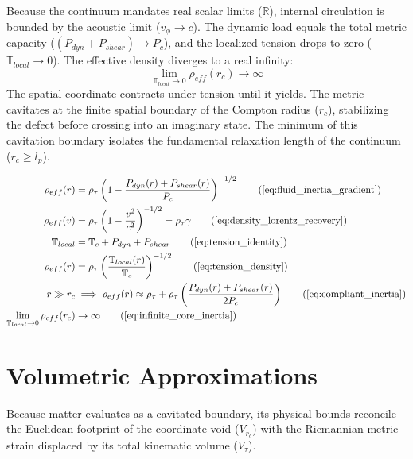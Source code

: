 Because the continuum mandates real scalar limits ($\mathbb{R}$), internal circulation is bounded by the acoustic limit ($v_\phi \to c$). The dynamic load equals the total metric capacity ($(P_{dyn} + P_{shear}) \to P_c$), and the localized tension drops to zero ($\mathbb{T}_{local} \to 0$). The effective density diverges to a real infinity: 
\begin{equation}
    \lim_{\mathbb{T}_{local} \to 0} \rho_{eff}(r_c) \to \infty \label{eq:infinite_core_inertia}
\end{equation}
The spatial coordinate contracts under tension until it yields. The metric cavitates at the finite spatial boundary of the Compton radius ($r_c$), stabilizing the defect before crossing into an imaginary state. The minimum of this cavitation boundary isolates the fundamental relaxation length of the continuum ($r_c \ge l_p$).

\begin{tcolorbox}[recallbox, title={\ref{box:fluid_inertia}. Origin of Inertia (Strain Compactness \& Tension)}]
\begin{align}
    \rho_{eff}(r) &= \rho_{\tau} \left( 1 - \frac{P_{dyn}(r) + P_{shear}(r)}{P_c} \right)^{-1/2} \tag{\ref{eq:fluid_inertia_gradient}} \\
    \rho_{eff}(v) &= \rho_{\tau} \left( 1 - \frac{v^2}{c^2} \right)^{-1/2} = \rho_{\tau} \gamma \tag{\ref{eq:density_lorentz_recovery}} \\
    \mathbb{T}_{local} &= \mathbb{T}_c + P_{dyn} + P_{shear} \tag{\ref{eq:tension_identity}} \\
    \rho_{eff}(r) &= \rho_{\tau} \left( \frac{\mathbb{T}_{local}(r)}{\mathbb{T}_c} \right)^{-1/2} \tag{\ref{eq:tension_density}} \\
    r \gg r_c &\implies \rho_{eff}(r) \approx \rho_{\tau} + \rho_{\tau} \left( \frac{P_{dyn}(r) + P_{shear}(r)}{2P_c} \right) \tag{\ref{eq:compliant_inertia}} \\
    \lim_{\mathbb{T}_{local} \to 0} \rho_{eff}(r_c) &\to \infty \tag{\ref{eq:infinite_core_inertia}}
\end{align}
\end{tcolorbox}

\section{Volumetric Approximations}
\label{sec:deriv_volumetric_inverse_cube}

Because matter evaluates as a cavitated boundary, its physical bounds reconcile the Euclidean footprint of the coordinate void ($V_{r_c}$) with the Riemannian metric strain displaced by its total kinematic volume ($V_\tau$). 

